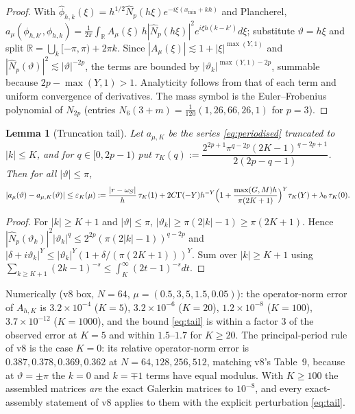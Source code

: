 \documentclass[11pt]{amsart}
\newtheorem{lemma}[theorem]{Lemma}
\theoremstyle{remark}
\newcommand{\R}{\mathbb R}
\begin{document}
\begin{proof}
With $\widehat\phi_{h,k}(\xi)=h^{1/2}\widehat N_p(h\xi)e^{-i\xi(x_{\min}+kh)}$ and
Plancherel,
$a_\mu(\phi_{h,k'},\phi_{h,k})=\frac1{2\pi}\int_\R A_\mu(\xi)\,h|\widehat N_p(h\xi)|^2e^{i\xi h(k-k')}d\xi$;
substitute $\vartheta=h\xi$ and split $\R=\bigcup_k[-\pi,\pi)+2\pi k$.  Since
$|A_\mu(\xi)|\lesssim 1+|\xi|^{\max(Y,1)}$ and $|\widehat N_p(\vartheta)|^2\lesssim|\vartheta|^{-2p}$,
the terms are bounded by $|\vartheta_k|^{\max(Y,1)-2p}$, summable because
$2p-\max(Y,1)>1$.  Analyticity follows from that of each term and uniform
convergence of derivatives.  The mass symbol is the Euler--Frobenius
polynomial of $N_{2p}$ (entries $N_6(3+m)=\frac1{120}(1,26,66,26,1)$ for $p=3$).
\end{proof}

\begin{lemma}[Truncation tail]\label{lem:tail}
Let $a_{\mu,K}$ be the series \eqref{eq:periodised} truncated to $|k|\le K$,
and for $q\in[0,2p-1)$ put
$\tau_K(q):=\dfrac{2^{2p+1}\pi^{q-2p}(2K-1)^{\,q-2p+1}}{2(2p-q-1)}$.
Then for all $|\vartheta|\le\pi$,
\begin{equation}
 |a_\mu(\vartheta)-a_{\mu,K}(\vartheta)|
 \le \varepsilon_K(\mu):=\frac{|r-\omega_S|}{h}\,\tau_K(1)
 +2C\Gamma(-Y)h^{-Y}\Bigl(1+\frac{\max(G,M)h}{\pi(2K+1)}\Bigr)^{Y}\tau_K(Y)
 +\lambda_0\,\tau_K(0).
 \label{eq:tail}
\end{equation}
\end{lemma}
\begin{proof}
For $|k|\ge K+1$ and $|\vartheta|\le\pi$, $|\vartheta_k|\ge\pi(2|k|-1)\ge\pi(2K+1)$.
Hence $|\widehat N_p(\vartheta_k)|^2|\vartheta_k|^q\le2^{2p}(\pi(2|k|-1))^{q-2p}$ and
$|\delta+i\vartheta_k|^Y\le|\vartheta_k|^Y(1+\delta/(\pi(2K+1)))^Y$.  Sum over
$|k|\ge K+1$ using $\sum_{k\ge K+1}(2k-1)^{-s}\le\int_K^\infty(2t-1)^{-s}dt$.
\end{proof}

\noindent
Numerically (v8 box, $N=64$, $\mu=(0.5,3,5,1.5,0.05)$): the operator-norm
error of $A_{h,K}$ is $3.2\times10^{-4}$ ($K=5$), $3.2\times10^{-6}$ ($K=20$),
$1.2\times10^{-8}$ ($K=100$), $3.7\times10^{-12}$ ($K=1000$), and the bound
\eqref{eq:tail} is within a factor $3$ of the observed error at $K=5$ and within $1.5$--$1.7$ for $K\ge20$.
The principal-period rule of v8 is the case $K=0$: its relative operator-norm
error is $0.387,0.378,0.369,0.362$ at $N=64,128,256,512$, matching v8's
Table~9, because at $\vartheta=\pm\pi$ the $k=0$ and $k=\mp1$ terms have equal
modulus.  With $K\ge100$ the assembled matrices \emph{are} the exact Galerkin
matrices to $10^{-8}$, and every exact-assembly statement of v8 applies to
them with the explicit perturbation \eqref{eq:tail}.
\end{document}
